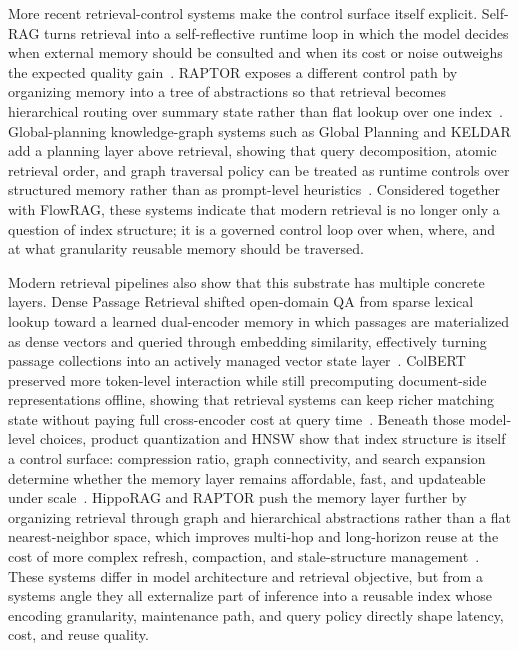 \documentclass[acmsmall,screen,review]{acmart}
\begin{document}
More recent retrieval-control systems make the control surface itself explicit. Self-RAG turns retrieval into a self-reflective runtime loop in which the model decides when external memory should be consulted and when its cost or noise outweighs the expected quality gain~\cite{asai2024selfrag}. RAPTOR exposes a different control path by organizing memory into a tree of abstractions so that retrieval becomes hierarchical routing over summary state rather than flat lookup over one index~\cite{sarthi2024raptor}. Global-planning knowledge-graph systems such as Global Planning and KELDAR add a planning layer above retrieval, showing that query decomposition, atomic retrieval order, and graph traversal policy can be treated as runtime controls over structured memory rather than as prompt-level heuristics~\cite{li2025global,li2024keldar}. Considered together with FlowRAG, these systems indicate that modern retrieval is no longer only a question of index structure; it is a governed control loop over when, where, and at what granularity reusable memory should be traversed.

Modern retrieval pipelines also show that this substrate has multiple concrete layers. Dense Passage Retrieval shifted open-domain QA from sparse lexical lookup toward a learned dual-encoder memory in which passages are materialized as dense vectors and queried through embedding similarity, effectively turning passage collections into an actively managed vector state layer~\cite{karpukhin2020dpr}. ColBERT preserved more token-level interaction while still precomputing document-side representations offline, showing that retrieval systems can keep richer matching state without paying full cross-encoder cost at query time~\cite{khattab2020colbert}. Beneath those model-level choices, product quantization and HNSW show that index structure is itself a control surface: compression ratio, graph connectivity, and search expansion determine whether the memory layer remains affordable, fast, and updateable under scale~\cite{jegou2011pq,malkov2020hnsw}. HippoRAG and RAPTOR push the memory layer further by organizing retrieval through graph and hierarchical abstractions rather than a flat nearest-neighbor space, which improves multi-hop and long-horizon reuse at the cost of more complex refresh, compaction, and stale-structure management~\cite{wang2024hipporag,sarthi2024raptor}. These systems differ in model architecture and retrieval objective, but from a systems angle they all externalize part of inference into a reusable index whose encoding granularity, maintenance path, and query policy directly shape latency, cost, and reuse quality.
\end{document}
